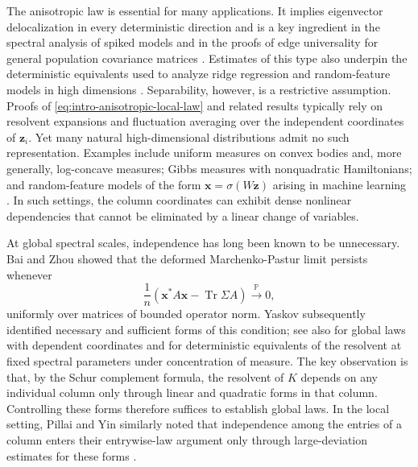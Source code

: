 \documentclass[11pt,reqno]{amsart}
\def\x{\mathbf{x}}
\def\z{\mathbf{z}}
\def\P{\mathbb{P}}
\def\Tr{\operatorname{Tr}}
\theoremstyle{definition}
\numberwithin{equation}{section}
\numberwithin{figure}{section}
\begin{document}
The anisotropic law is essential for many applications. It implies eigenvector delocalization in every deterministic direction and is a key ingredient in the spectral analysis of spiked models \cite{baik2005phase,bloemendal2016principal} and in the proofs of edge universality for general population covariance matrices \cite{bao2015universality,lee2016tracy,knowles2017anisotropic,fan2022tracy}. Estimates of this type also underpin the deterministic equivalents used to analyze ridge regression and random-feature models in high dimensions \cite{louart2018random,hastie2022surprises,mei2022generalization,cheng2024dimension,misiakiewicz2024non}. Separability, however, is a restrictive assumption. Proofs of \eqref{eq:intro-anisotropic-local-law} and related results typically rely on resolvent expansions and fluctuation averaging over the independent coordinates of $\z_i$. Yet many natural high-dimensional distributions admit no such representation. Examples include uniform measures on convex bodies and, more generally, log-concave measures; Gibbs measures with nonquadratic Hamiltonians; and random-feature models of the form $\x=\sigma(W\z)$ arising in machine learning \cite{pennington2017nonlinear,louart2018random,mei2022generalization}. In such settings, the column coordinates can exhibit dense nonlinear dependencies that cannot be eliminated by a linear change of variables. 

At global spectral scales, independence has long been known to be unnecessary. Bai and Zhou \cite{bai2008large} showed that the deformed Marchenko-Pastur limit persists whenever 
\begin{equation}\label{eq:qualitative_proba_convergence}
\frac{1}{n}(\x^*A\x-\Tr\Sigma A)\overset{\P}{\longrightarrow} 0,
\end{equation}
uniformly over matrices of bounded operator norm. Yaskov \cite{yaskov2016necessary} subsequently identified necessary and sufficient forms of this condition; see also \cite{elkaroui2009concentration,pajor2009limiting} for global laws with dependent coordinates and \cite{louart2018concentration} for deterministic equivalents of the resolvent at fixed spectral parameters under concentration of measure. The key observation is that, by the Schur complement formula, the resolvent of $K$ depends on any individual column only through linear and quadratic forms in that column. Controlling these forms therefore suffices to establish global laws. In the local setting, Pillai and Yin similarly noted that independence among the entries of a column enters their entrywise-law argument only through large-deviation estimates for these forms \cite[Theorem~3.6]{pillai2014universality}. 
\end{document}

